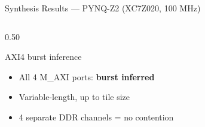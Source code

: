 \documentclass[aspectratio=169, 10pt]{beamer}
\newcommand{\good}[1]{{\color{GoodGrn}\textbf{#1}}}
\begin{document}
\begin{frame}{Synthesis Results --- PYNQ-Z2 (XC7Z020, 100 MHz)}
\begin{columns}[T]
\begin{column}{0.50\textwidth}
      \vspace{0.25cm}
      \begin{block}{AXI4 burst inference}
        \vspace{2pt}
        \begin{itemize}\setlength\itemsep{2pt}
          \item All 4 M\_AXI ports: \good{burst inferred}
          \item Variable-length, up to tile size
          \item 4 separate DDR channels = no contention
        \end{itemize}
        \vspace{2pt}
      \end{block}
    \end{column}
  \end{columns}
\end{frame}
\end{document}
